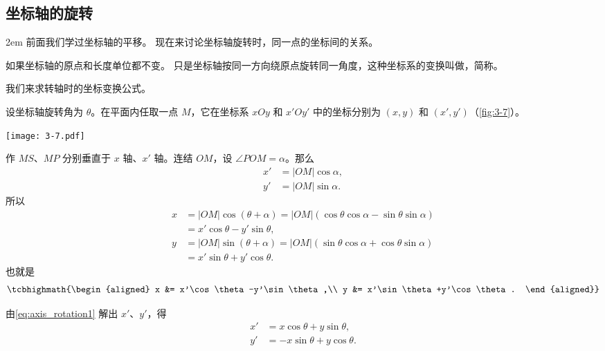 \subsection{坐标轴的旋转}\label{subsec:axis_rotation}
\medskip\noindent
\begin{minipage}{0.55\linewidth}\parindent2em
前面我们学过坐标轴的平移。
现在来讨论坐标轴旋转时，同一点的坐标间的关系。

如果坐标轴的原点和长度单位都不变。
只是坐标轴按同一方向绕原点旋转同一角度，这种坐标系的变换叫做，简称。

我们来求转轴时的坐标变换公式。

设坐标轴旋转角为 $\theta$。在平面内任取一点 $M$，它在坐标系 $xOy$ 和 $x'Oy'$ 中的坐标分别为 $(x,y)$ 和 $(x',y')$（\cref{fig:3-7}）。
\end{minipage}\hfill
\begin{minipage}{0.4\linewidth}\centering
\begin{figurehere}
  \texttt{[image: 3-7.pdf]}
  \caption{}\label{fig:3-7}
\end{figurehere}
\end{minipage}

\medskip
作 $MS$、$MP$ 分别垂直于 $x$ 轴、$x'$ 轴。连结 $OM$，设 $\angle POM=\alpha$。那么
\begin{align*} 
  x' & = |OM|\cos\alpha, \\
  y' & = |OM|\sin\alpha.
\end{align*}
所以
\begin{align*} 
  x & = |OM|\cos(\theta+\alpha)=|OM|(\cos\theta\cos\alpha-\sin\theta\sin\alpha)\\
    & = x'\cos\theta-y'\sin\theta,\\
  y & = |OM|\sin(\theta+\alpha)=|OM|(\sin\theta\cos\alpha+\cos\theta\sin\alpha)\\
    & = x'\sin\theta+y'\cos\theta.
\end{align*}
也就是
\begin{equation}
  \label{eq:axis_rotation1}
  \tcbhighmath{\begin{aligned}
    x &= x'\cos\theta-y'\sin\theta,\\
    y &= x'\sin\theta+y'\cos\theta.
  \end{aligned}}
\end{equation}

由\cref{eq:axis_rotation1} 解出 $x'$、$y'$，得
\begin{equation}
  \label{eq:axis_rotation2}
  \begin{aligned}
    x' &= x\cos\theta+y\sin\theta,\\
    y' &= -x\sin\theta+y\cos\theta.
  \end{aligned}
\end{equation}

